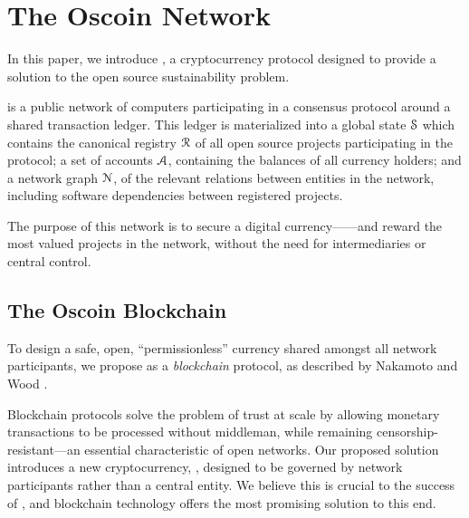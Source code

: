 \section{The Oscoin Network}
\label{s:oscoin}

\noindent In this paper, we introduce \oscoin{}, a cryptocurrency protocol
designed to provide a solution to the open source sustainability problem.

\Oscoin{} is a public network of computers participating in a consensus
protocol around a shared transaction ledger.
This ledger is materialized into a global state $\mathcal{S}$ which
contains the canonical registry $\mathcal{R}$ of all open source
projects participating in the protocol; a set of accounts
$\mathcal{A}$, containing the balances of all currency holders; and
a network graph $\mathcal{N}$, of the relevant relations between
entities in the network, including software dependencies between registered projects.

The purpose of this network is to secure a digital currency---\oscoin{}---and
reward the most valued projects in the network, without the need
for intermediaries or central control.

\subsection{The Oscoin Blockchain}

To design a safe, open, ``permissionless'' currency shared amongst all network
participants, we propose \oscoin{} as a \emph{blockchain} protocol, as
described by Nakamoto \cite{bitcoin} and Wood \cite{ethereum}.

Blockchain protocols solve the problem of trust at scale by allowing monetary
transactions to be processed without middleman, while remaining
censorship-resistant---an essential characteristic of open networks.  Our
proposed solution introduces a new cryptocurrency, \oscoin{}, designed to be
governed by network participants rather than a central entity. We believe this is
crucial to the success of \oscoin{}, and blockchain technology offers the
most promising solution to this end.

